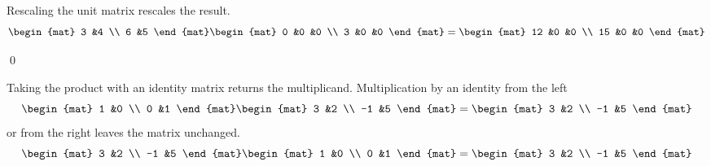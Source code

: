 \documentclass[10pt,t]{beamer}
\begin{document}
\begin{frame}
\pause
\ex 
Rescaling the unit matrix rescales the result.
\begin{equation*}
  \begin{mat}
    3 &4 \\
    6 &5
  \end{mat}
  \begin{mat}
    0 &0 &0 \\
    3 &0 &0
  \end{mat}
  =
  \begin{mat}
    12 &0 &0 \\
    15 &0 &0
  \end{mat}
\end{equation*}
\end{frame}




\begin{frame}
\lm[lm:ColsAndRowsInMatrixMult]
\end{frame}
\begin{frame}
\pf
{}
\qed
\end{frame}




\begin{frame}
\df[df:MainDiagonal]
\pause
\df[df:IdentityMatrix]
\pause
Taking the product with an identity matrix returns the multiplicand. 
\ex
Multiplication by an identity from the left
\begin{equation*}
  \begin{mat}
    1  &0 \\
    0  &1
  \end{mat}
  \begin{mat}
    3  &2  \\
   -1  &5
  \end{mat}
  =
  \begin{mat}
    3  &2  \\
   -1  &5
  \end{mat}
\end{equation*}
or from the right leaves the matrix unchanged.
\begin{equation*}
  \begin{mat}
    3  &2  \\
   -1  &5
  \end{mat}
  \begin{mat}
    1  &0 \\
    0  &1
  \end{mat}
  =
  \begin{mat}
    3  &2  \\
   -1  &5
  \end{mat}
\end{equation*}
\end{frame}
\end{document}
